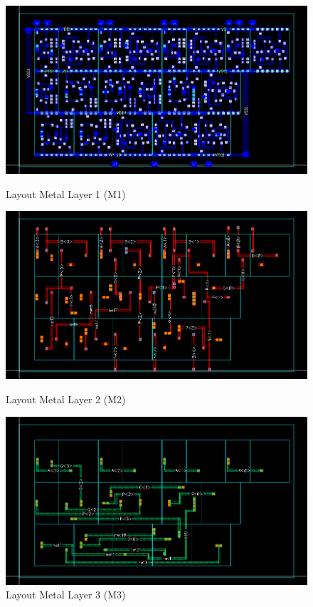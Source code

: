 \documentclass[a4paper,12pt]{article}
\begin{document}
\begin{figure}[H]
    \centering
    \begin{minipage}{0.49\textwidth}
        \centering
        \includegraphics[width=\textwidth]{images/LO_M1.png}
        \caption{Layout Metal Layer 1 (M1)}
    \end{minipage}
    \hfill
    \begin{minipage}{0.49\textwidth}
        \centering
        \includegraphics[width=\textwidth]{images/LO_M2.png}
        \caption{Layout Metal Layer 2 (M2)}
    \end{minipage}
    \hfill
    \begin{minipage}{0.49\textwidth}
        \centering
        \includegraphics[width=\textwidth]{images/LO_M3.png}
        \caption{Layout Metal Layer 3 (M3)}
    \end{minipage}
\end{figure}
\end{document}
